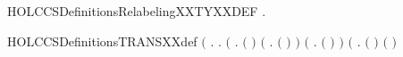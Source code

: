 \newcommand{\HOLCCSDefinitionsRelabelingXXISOXXDEF}{\UseVerbatim{HOLCCSDefinitionsRelabelingXXISOXXDEF}}
\begin{SaveVerbatim}{HOLCCSDefinitionsRelabelingXXTYXXDEF}
\HOLTokenTurnstile{} \HOLSymConst{\HOLTokenExists{}}.   
\end{SaveVerbatim}
\newcommand{\HOLCCSDefinitionsRelabelingXXTYXXDEF}{\UseVerbatim{HOLCCSDefinitionsRelabelingXXTYXXDEF}}
\begin{SaveVerbatim}{HOLCCSDefinitionsTRANSXXdef}
\HOLTokenTurnstile{}  \HOLSymConst{\ensuremath{=}}
   \ensuremath{(}\HOLTokenLambda{}  .
        \HOLSymConst{\HOLTokenForall{}}.
            \ensuremath{(}\HOLSymConst{\HOLTokenForall{}}  .
                 \ensuremath{(} \HOLSymConst{\ensuremath{=}} \HOLSymConst{\ensuremath{\ldotp}}\ensuremath{)} \HOLSymConst{\HOLTokenDisj{}}
                 \ensuremath{(}\HOLSymConst{\HOLTokenExists{}} . \ensuremath{(} \HOLSymConst{\ensuremath{=}}  \HOLSymConst{\ensuremath{+}} \ensuremath{)} \HOLSymConst{\HOLTokenConj{}}    \ensuremath{)} \HOLSymConst{\HOLTokenDisj{}}
                 \ensuremath{(}\HOLSymConst{\HOLTokenExists{}} . \ensuremath{(} \HOLSymConst{\ensuremath{=}}  \HOLSymConst{\ensuremath{+}} \ensuremath{)} \HOLSymConst{\HOLTokenConj{}}    \ensuremath{)} \HOLSymConst{\HOLTokenDisj{}}
                 \ensuremath{(}\HOLSymConst{\HOLTokenExists{}}  .
                      \ensuremath{(} \HOLSymConst{\ensuremath{=}}  \HOLSymConst{\ensuremath{\mid}} \ensuremath{)} \HOLSymConst{\HOLTokenConj{}} \ensuremath{(} \HOLSymConst{\ensuremath{=}}  \HOLSymConst{\ensuremath{\mid}} \ensuremath{)} \HOLSymConst{\HOLTokenConj{}}

\end{SaveVerbatim}
